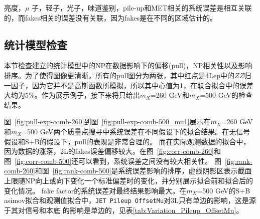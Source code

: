 亮度，$\mu$ 子，轻子，光子，味道鉴别，pile-up和MET相关的系统误差是相互关联的，而fakes相关的误差没有关联，因为fakes是在不同的区域估计的。

\subsection{统计模型检查}
本节检查建立的统计模型中的NP在数据影响下的偏移(pull)，NP相关性以及影响排序。为了使得图像更清晰，所有的pull图分为两张，其中红点是4Lep中的$ZZ$归一因子，因为它并不是高斯函数所模拟，所以其中心值为1，在联合拟合中的误差大约为5\%。作为展示例子，接下来将只给出$m_X$=260 GeV和$m_X$=500 GeV的检查结果。

图~\ref{fig:pull-exp-comb-260}到图~\ref{fig:pull-exp-comb-500_mu1}展示在$m_X$=260 GeV和$m_X$=500 GeV两个质量点搜寻中系统误差在不同假设下的拟合结果。在无信号假设和S+B的假设下，pull的表现是非常合理的。
而在实际观测数据的拟合中，因为数据的涨落，2L的fakes误差偏移较大。在图~\ref{fig:corr-comb-260}和图~\ref{fig:corr-comb-500}还可以看到，系统误差之间没有较大相关性。
图~\ref{fig:rank-comb-260}和图~\ref{fig:rank-comb-500}是系统误差影响的排序，虚线阴影区表示截面上限随NP向上或向下变化一个标准偏差时的变化，并分别展示拟合前和拟合后的变化情况。
fake factor的系统误差对最终结果影响最大。在$m_X$=500 GeV的S+B asimov拟合和观测值拟合中，\texttt{JET Pileup OffsetMu}对3L只有单边的影响，这是源于其对信号和本底
的影响是单边的，见表\ref{tab:Variation_Pileup_OffsetMu}。
\begin{table}
\scriptsize{}
\caption{系统误差\texttt{JET\_Pileup\_OffsetMu}对信号本底的相对影响，其正反变化不对称。}
\label{tab:Variation_Pileup_OffsetMu}
\end{table}

